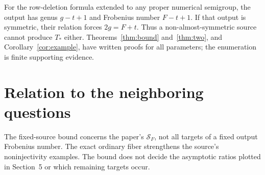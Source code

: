 \documentclass[11pt,a4paper]{article}
\theoremstyle{definition}
\theoremstyle{remark}
\begin{document}
For the row-deletion formula extended to any proper numerical semigroup,
the output has genus $g-t+1$ and Frobenius number $F-t+1$.
If that output is symmetric, their relation forces $2g=F+t$.
Thus a non-almost-symmetric source cannot produce $T_*$ either.
Theorems~\ref{thm:bound} and~\ref{thm:two}, and Corollary~\ref{cor:example}, have written
proofs for all parameters; the enumeration is finite supporting evidence.

\section{Relation to the neighboring questions}
The fixed-source bound concerns the paper's $\mathcal S_F$, not all targets
of a fixed output Frobenius number. The exact ordinary fiber strengthens
the source's noninjectivity examples. The bound does not decide the asymptotic
ratios plotted in Section~5 or which remaining targets occur.
\end{document}
